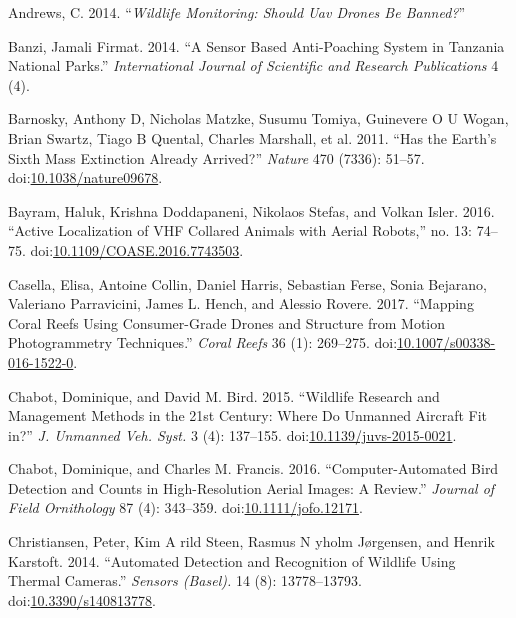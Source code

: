 \documentclass[]{interact}
\theoremstyle{plain}%
\theoremstyle{definition}
\theoremstyle{remark}
\begin{document}
\hypertarget{ref-Andrews2014}{}
Andrews, C. 2014. ``\emph{Wildlife Monitoring: Should Uav Drones Be
Banned?}''

\hypertarget{ref-banzi_sensor_2014}{}
Banzi, Jamali Firmat. 2014. ``A Sensor Based Anti-Poaching System in
Tanzania National Parks.'' \emph{International Journal of Scientific and
Research Publications} 4 (4).

\hypertarget{ref-barnosky_has_2011}{}
Barnosky, Anthony D, Nicholas Matzke, Susumu Tomiya, Guinevere O U
Wogan, Brian Swartz, Tiago B Quental, Charles Marshall, et al. 2011.
``Has the Earth's Sixth Mass Extinction Already Arrived?'' \emph{Nature}
470 (7336): 51--57.
doi:\href{https://doi.org/10.1038/nature09678}{10.1038/nature09678}.

\hypertarget{ref-bayram_active_2016}{}
Bayram, Haluk, Krishna Doddapaneni, Nikolaos Stefas, and Volkan Isler.
2016. ``Active Localization of VHF Collared Animals with Aerial
Robots,'' no. 13: 74--75.
doi:\href{https://doi.org/10.1109/COASE.2016.7743503}{10.1109/COASE.2016.7743503}.

\hypertarget{ref-casella_mapping_2017}{}
Casella, Elisa, Antoine Collin, Daniel Harris, Sebastian Ferse, Sonia
Bejarano, Valeriano Parravicini, James L. Hench, and Alessio Rovere.
2017. ``Mapping Coral Reefs Using Consumer-Grade Drones and Structure
from Motion Photogrammetry Techniques.'' \emph{Coral Reefs} 36 (1):
269--275.
doi:\href{https://doi.org/10.1007/s00338-016-1522-0}{10.1007/s00338-016-1522-0}.

\hypertarget{ref-chabot_wildlife_2015}{}
Chabot, Dominique, and David M. Bird. 2015. ``Wildlife Research and
Management Methods in the 21st Century: Where Do Unmanned Aircraft Fit
in?'' \emph{J. Unmanned Veh. Syst.} 3 (4): 137--155.
doi:\href{https://doi.org/10.1139/juvs-2015-0021}{10.1139/juvs-2015-0021}.

\hypertarget{ref-chabot_computer-automated_2016}{}
Chabot, Dominique, and Charles M. Francis. 2016. ``Computer-Automated
Bird Detection and Counts in High-Resolution Aerial Images: A Review.''
\emph{Journal of Field Ornithology} 87 (4): 343--359.
doi:\href{https://doi.org/10.1111/jofo.12171}{10.1111/jofo.12171}.

\hypertarget{ref-christiansen_automated_2014}{}
Christiansen, Peter, Kim A rild Steen, Rasmus N yholm Jørgensen, and
Henrik Karstoft. 2014. ``Automated Detection and Recognition of Wildlife
Using Thermal Cameras.'' \emph{Sensors (Basel).} 14 (8): 13778--13793.
doi:\href{https://doi.org/10.3390/s140813778}{10.3390/s140813778}.
\end{document}

